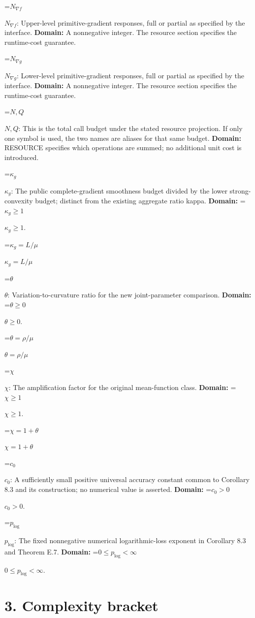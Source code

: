 \documentclass[10pt,a4paper]{article}
\newcommand{\AtlasMath}[1]{\par\begingroup\centering\setbox0=\hbox{$\displaystyle #1$}\ifdim\wd0>1.4\linewidth\typeout{ATLAS WIDE FORMULA: \the\wd0}\fi\ifdim\wd0>\linewidth\resizebox{\linewidth}{!}{\box0}\else\box0\fi\par\endgroup}
\newcommand{\AtlasInlineMath}[1]{\begingroup\setbox0=\hbox{$#1$}\ifdim\wd0>.4\linewidth\endgroup\AtlasMath{#1}\else\endgroup$#1$\fi}
\begin{document}
\AtlasInlineMath{N_{\nabla f}}: Upper-level primitive-gradient responses, full or partial as specified by the interface. \textbf{Domain:} A nonnegative integer. The resource section specifies the runtime-cost guarantee.



\AtlasInlineMath{N_{\nabla g}}: Lower-level primitive-gradient responses, full or partial as specified by the interface. \textbf{Domain:} A nonnegative integer. The resource section specifies the runtime-cost guarantee.



\AtlasInlineMath{N,Q}: This is the total call budget under the stated resource projection. If only one symbol is used, the two names are aliases for that same budget. \textbf{Domain:} RESOURCE specifies which operations are summed; no additional unit cost is introduced.



\AtlasInlineMath{\kappa_g}: The public complete-gradient smoothness budget divided by the lower strong-convexity budget; distinct from the existing aggregate ratio kappa. \textbf{Domain:} \AtlasInlineMath{\kappa_g\ge1}.



\AtlasInlineMath{\kappa_g=L/\mu}



\AtlasInlineMath{\theta}: Variation-to-curvature ratio for the new joint-parameter comparison. \textbf{Domain:} \AtlasInlineMath{\theta\ge0}.



\AtlasInlineMath{\theta=\rho/\mu}



\AtlasInlineMath{\chi}: The amplification factor for the original mean-function class. \textbf{Domain:} \AtlasInlineMath{\chi\ge1}.



\AtlasInlineMath{\chi=1+\theta}



\AtlasInlineMath{c_0}: A sufficiently small positive universal accuracy constant common to Corollary 8.3 and its construction; no numerical value is asserted. \textbf{Domain:} \AtlasInlineMath{c_0>0}.



\AtlasInlineMath{p_{\log}}: The fixed nonnegative numerical logarithmic-loss exponent in Corollary 8.3 and Theorem E.7. \textbf{Domain:} \AtlasInlineMath{0\le p_{\log}<\infty}.



\section{3. Complexity bracket}
\end{document}
